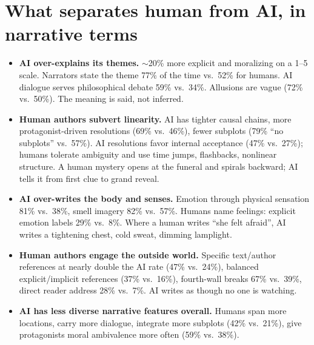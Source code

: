 \documentclass[11pt]{article}
\begin{document}
\section{What separates human from AI, in narrative terms}
\begin{itemize}
\item \textbf{AI over-explains its themes.} $\sim$20\% more explicit and moralizing on a 1--5 scale. Narrators state the theme 77\% of the time vs.\ 52\% for humans. AI dialogue serves philosophical debate 59\% vs.\ 34\%. Allusions are vague (72\% vs.\ 50\%). The meaning is said, not inferred.
\item \textbf{Human authors subvert linearity.} AI has tighter causal chains, more protagonist-driven resolutions (69\% vs.\ 46\%), fewer subplots (79\% ``no subplots'' vs.\ 57\%). AI resolutions favor internal acceptance (47\% vs.\ 27\%); humans tolerate ambiguity and use time jumps, flashbacks, nonlinear structure. A human mystery opens at the funeral and spirals backward; AI tells it from first clue to grand reveal.
\item \textbf{AI over-writes the body and senses.} Emotion through physical sensation 81\% vs.\ 38\%, smell imagery 82\% vs.\ 57\%. Humans name feelings: explicit emotion labels 29\% vs.\ 8\%. Where a human writes ``she felt afraid'', AI writes a tightening chest, cold sweat, dimming lamplight.
\item \textbf{Human authors engage the outside world.} Specific text/author references at nearly double the AI rate (47\% vs.\ 24\%), balanced explicit/implicit references (37\% vs.\ 16\%), fourth-wall breaks 67\% vs.\ 39\%, direct reader address 28\% vs.\ 7\%. AI writes as though no one is watching.
\item \textbf{AI has less diverse narrative features overall.} Humans span more locations, carry more dialogue, integrate more subplots (42\% vs.\ 21\%), give protagonists moral ambivalence more often (59\% vs.\ 38\%).
\end{itemize}
\end{document}
